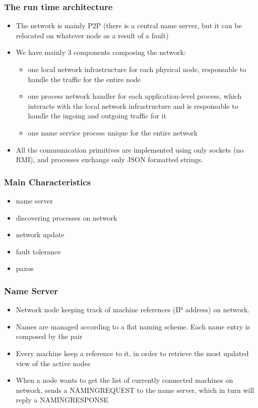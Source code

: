 \documentclass{beamer}
\begin{document}
\begin{frame}
  \frametitle{The run time architecture}
  \begin{itemize}
  \item The network is mainly P2P (there is a central name server, but it can be relocated on whatever node as a result of a fault)
  \item We have mainly 3 components composing the network:
    \begin{itemize}
    \item one local network infrastructure for each physical node, responsable to handle the traffic for the entire node
    \item one process network handler for each application-level process, which interacts with the local network infrastructure and is responsable to handle the ingoing and outgoing traffic for it
    \item one name service process unique for the entire network
    \end{itemize}
  \item All the communication primitives are implemented using only sockets (no RMI), and processes exchange only JSON formatted strings. 
  \end{itemize}
\end{frame}

\begin{frame}
  \frametitle{Main Characteristics}
  \begin{itemize}
  \item name server
  \item discovering processes on network
  \item network update
  \item fault tolerance
  \item paxos
  \end{itemize}

\end{frame}

\begin{frame}
  \frametitle{Name Server}
  \begin{itemize}
  \item Network node keeping track of machine references (IP address) on network.
  \item Names are managed according to a flat naming scheme. Each name entry is composed by the pair 
  \item Every machine keep a reference to it, in order to retrieve the most updated view of the active nodes
  \item When a node wants to get the list of currently connected machines on network, sends a NAMINGREQUEST to the name server, which in turn will reply a NAMINGRESPONSE
  \end{itemize}
\end{frame}
\end{document}
